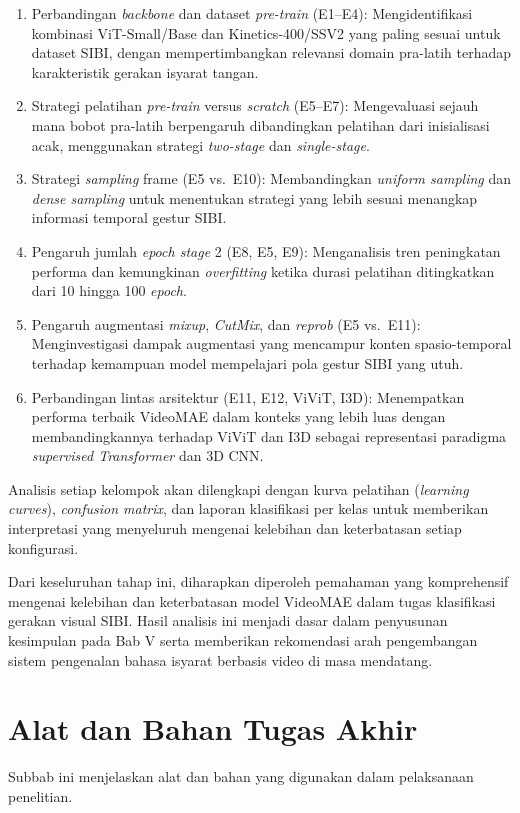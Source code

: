\begin{enumerate}[noitemsep]
    \item Perbandingan \textit{backbone} dan dataset \textit{pre-train} (E1--E4): Mengidentifikasi kombinasi ViT-Small/Base dan Kinetics-400/SSV2 yang paling sesuai untuk dataset SIBI, dengan mempertimbangkan relevansi domain pra-latih terhadap karakteristik gerakan isyarat tangan.
    \item Strategi pelatihan \textit{pre-train} versus \textit{scratch} (E5--E7): Mengevaluasi sejauh mana bobot pra-latih berpengaruh dibandingkan pelatihan dari inisialisasi acak, menggunakan strategi \textit{two-stage} dan \textit{single-stage}.
    \item Strategi \textit{sampling} frame (E5 vs.\ E10): Membandingkan \textit{uniform sampling} dan \textit{dense sampling} untuk menentukan strategi yang lebih sesuai menangkap informasi temporal gestur SIBI.
    \item Pengaruh jumlah \textit{epoch stage} 2 (E8, E5, E9): Menganalisis tren peningkatan performa dan kemungkinan \textit{overfitting} ketika durasi pelatihan ditingkatkan dari 10 hingga 100 \textit{epoch}.
    \item Pengaruh augmentasi \textit{mixup}, \textit{CutMix}, dan \textit{reprob} (E5 vs.\ E11): Menginvestigasi dampak augmentasi yang mencampur konten spasio-temporal terhadap kemampuan model mempelajari pola gestur SIBI yang utuh.
    \item Perbandingan lintas arsitektur (E11, E12, ViViT, I3D): Menempatkan performa terbaik VideoMAE dalam konteks yang lebih luas dengan membandingkannya terhadap ViViT dan I3D sebagai representasi paradigma \textit{supervised Transformer} dan 3D CNN.
\end{enumerate}
Analisis setiap kelompok akan dilengkapi dengan kurva pelatihan (\textit{learning curves}), \textit{confusion matrix}, dan laporan klasifikasi per kelas untuk memberikan interpretasi yang menyeluruh mengenai kelebihan dan keterbatasan setiap konfigurasi.\par
Dari keseluruhan tahap ini, diharapkan diperoleh pemahaman yang komprehensif mengenai kelebihan dan keterbatasan model VideoMAE dalam tugas klasifikasi gerakan visual SIBI. Hasil analisis ini menjadi dasar dalam penyusunan kesimpulan pada Bab V serta memberikan rekomendasi arah pengembangan sistem pengenalan bahasa isyarat berbasis video di masa mendatang.\par

\section{Alat dan Bahan Tugas Akhir} \label{III.Alat_dan_Bahan}
Subbab ini menjelaskan alat dan bahan yang digunakan dalam pelaksanaan penelitian.\par

